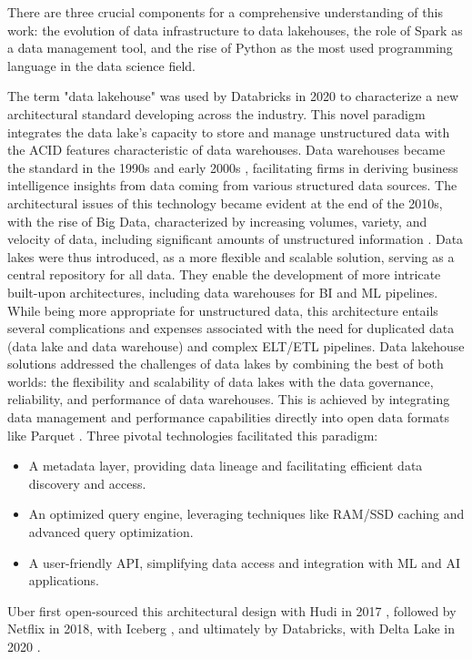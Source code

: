 There are three crucial components for a comprehensive understanding of this work: the evolution of data infrastructure to data lakehouses, the role of Spark as a data management tool, and the rise of Python as the most used programming language in the data science field.

\smallskip

The term "data lakehouse" was used by Databricks in 2020 \cite{WhatLakehouse2020} to characterize a new architectural standard developing across the industry. This novel paradigm integrates the data lake's capacity to store and manage unstructured data with the \gls{ACID} features characteristic of data warehouses.
Data warehouses became the standard in the 1990s and early 2000s \cite{chaudhuriOverviewDataWarehousing1997}, facilitating firms in deriving business intelligence insights from data coming from various structured data sources. The architectural issues of this technology became evident at the end of the 2010s, with the rise of Big Data, characterized by increasing volumes, variety, and velocity of data, including significant amounts of unstructured information \cite{ederUnstructuredData802008}. 
Data lakes were thus introduced, as a more flexible and scalable solution, serving as a central repository for all data. They enable the development of more intricate built-upon architectures, including data warehouses for \gls{BI} and \gls{ML} pipelines. While being more appropriate for unstructured data, this architecture entails several complications and expenses associated with the need for duplicated data (data lake and data warehouse) and complex \gls{ELT}/\gls{ETL} pipelines.
Data lakehouse solutions addressed the challenges of data lakes by combining the best of both worlds: the flexibility and scalability of data lakes with the data governance, reliability, and performance of data warehouses. This is achieved by integrating data management and performance capabilities directly into open data formats like Parquet \cite{DremelMadeSimple}. Three pivotal technologies facilitated this paradigm:
\begin{itemize}
    \item A metadata layer, providing data lineage and facilitating efficient data discovery and access.
    \item An optimized query engine, leveraging techniques like \gls{RAM}/\gls{SSD} caching and advanced query optimization.
    \item A user-friendly \gls{API}, simplifying data access and integration with \gls{ML} and \gls{AI} applications.
\end{itemize}
Uber first open-sourced this architectural design with Hudi in 2017 \cite{rajaperumalUberEngineeringIncremental2017}, followed by Netflix in 2018, with Iceberg \cite{IcebergExamples2024}, and ultimately by Databricks, with Delta Lake in 2020 \cite{armbrustDeltaLakeHighperformance2020}.

